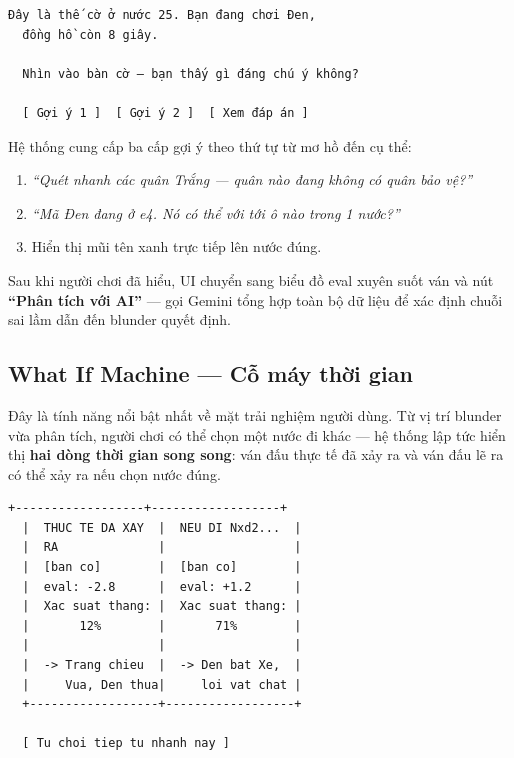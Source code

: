 \documentclass[14pt,a4paper]{extarticle}
\begin{document}
\begin{uibox}
\begin{Verbatim}[fontsize=\small]
  Đây là thế cờ ở nước 25. Bạn đang chơi Đen,
  đồng hồ còn 8 giây.

  Nhìn vào bàn cờ — bạn thấy gì đáng chú ý không?

  [ Gợi ý 1 ]  [ Gợi ý 2 ]  [ Xem đáp án ]
\end{Verbatim}
\end{uibox}

Hệ thống cung cấp ba cấp gợi ý theo thứ tự từ mơ hồ đến cụ thể:

\begin{enumerate}
  \item \textit{``Quét nhanh các quân Trắng --- quân nào đang không có quân
    bảo vệ?''}
  \item \textit{``Mã Đen đang ở e4. Nó có thể với tới ô nào trong 1 nước?''}
  \item Hiển thị mũi tên xanh trực tiếp lên nước đúng.
\end{enumerate}

Sau khi người chơi đã hiểu, UI chuyển sang biểu đồ eval xuyên suốt ván và nút
\textbf{``Phân tích với AI''} --- gọi Gemini tổng hợp toàn bộ dữ liệu để xác
định chuỗi sai lầm dẫn đến blunder quyết định.

\subsection{What If Machine --- Cỗ máy thời gian}

Đây là tính năng nổi bật nhất về mặt trải nghiệm người dùng. Từ vị trí blunder
vừa phân tích, người chơi có thể chọn một nước đi khác --- hệ thống lập tức
hiển thị \textbf{hai dòng thời gian song song}: ván đấu thực tế đã xảy ra và
ván đấu lẽ ra có thể xảy ra nếu chọn nước đúng.

\newpage

\begin{uibox}
\begin{Verbatim}[fontsize=\small]
  +------------------+------------------+
  |  THUC TE DA XAY  |  NEU DI Nxd2...  |
  |  RA              |                  |
  |  [ban co]        |  [ban co]        |
  |  eval: -2.8      |  eval: +1.2      |
  |  Xac suat thang: |  Xac suat thang: |
  |       12%        |       71%        |
  |                  |                  |
  |  -> Trang chieu  |  -> Den bat Xe,  |
  |     Vua, Den thua|     loi vat chat |
  +------------------+------------------+

  [ Tu choi tiep tu nhanh nay ]
\end{Verbatim}
\end{uibox}
\end{document}
